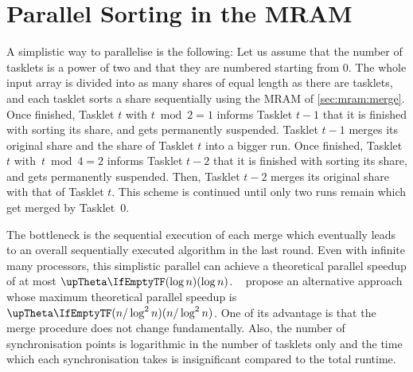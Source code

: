 \chapter{Parallel Sorting in the MRAM}
\label{sec:par}

A simplistic way to parallelise \MS{} is the following:
Let us assume that the number of tasklets is a power of two and that they are numbered starting from 0.
The whole input array is divided into as many shares of equal length as there are tasklets, and each tasklet sorts a share sequentially using the \ac{MRAM} \MS{} of \cref{sec:mram:merge}.
Once finished, Tasklet \(t\) with \(t \bmod 2 = 1\) informs Tasklet \(t - 1\) that it is finished with sorting its share, and gets permanently suspended.
Tasklet \(t - 1\) merges its original share and the share of Tasklet \(t\) into a bigger run.
Once finished, Tasklet \(t\) with~\(t \bmod 4 = 2\) informs Tasklet \(t - 2\) that it is finished with sorting its share, and gets permanently suspended.
Then, Tasklet \(t - 2\) merges its original share with that of Tasklet \(t\).
This scheme is continued until only two runs remain which get merged by Tasklet~0.

The bottleneck is the sequential execution of each merge which eventually leads to an overall sequentially executed algorithm in the last round.
Even with infinite many processors, this simplistic parallel \MS{} can achieve a theoretical parallel speedup of at most \(\bigtheta{\log n}\).
~\cite{cormen2013algorithmen} propose an alternative approach whose maximum theoretical parallel speedup is \(\bigtheta{n / \log^2 n}\).
One of its advantage is that the merge procedure does not change fundamentally.
Also, the number of synchronisation points is logarithmic in the number of tasklets only and the time which each synchronisation takes is insignificant compared to the total runtime.

